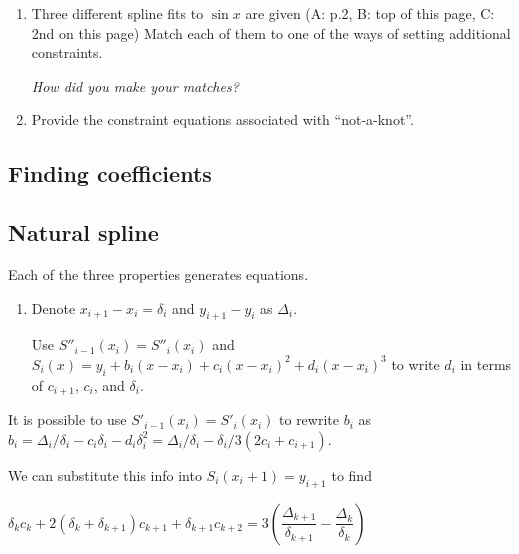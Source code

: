 \documentclass[12pt,letterpaper,noanswers]{exam}
\begin{document}
\begin{enumerate}[resume=classQ]
    \item Three different spline fits to $\sin x$ are given (A: p.2, B: top of this page, C: 2nd on this page)  Match each of them to one of the ways of setting additional constraints.
    
    \emph{How did you make your matches?}
    
    \vspace{1cm}
    
    \item Provide the constraint equations associated with ``not-a-knot''.

    
\end{enumerate}

\subsection*{Finding coefficients}

\subsection*{Natural spline}

Each of the three properties generates equations.
\begin{enumerate}[resume]
\item Denote $x_{i+1}-x_i = \delta_i$ and $y_{i+1}-y_i$ as $\Delta_i$.  

Use $S''_{i-1}(x_i) = S''_i(x_i)$ and $S_i(x) = y_i + b_i(x-x_i) + c_i(x-x_i)^2 + d_i(x-x_i)^3$ to write $d_{i}$ in terms of $c_{i+1}$, $c_i$, and $\delta_i$.


\end{enumerate}
 It is possible to use $S'_{i-1}(x_i) = S'_i(x_i)$ to rewrite $b_i$ as $b_i = \Delta_i/\delta_i - c_i\delta_i - d_i\delta_i^2 = \Delta_i/\delta_i - \delta_i/3(2c_i + c_{i+1})$.

 We can substitute this info into $S_i(x_i+1) = y_{i+1}$ to find

$\delta_k c_k + 2(\delta_k+\delta_{k+1})c_{k+1} + \delta_{k+1}c_{k+2} =3 \left(\dfrac{\Delta_{k+1}}{\delta_{k+1}} - \dfrac{\Delta_k}{\delta_k}\right)$
\end{document}
